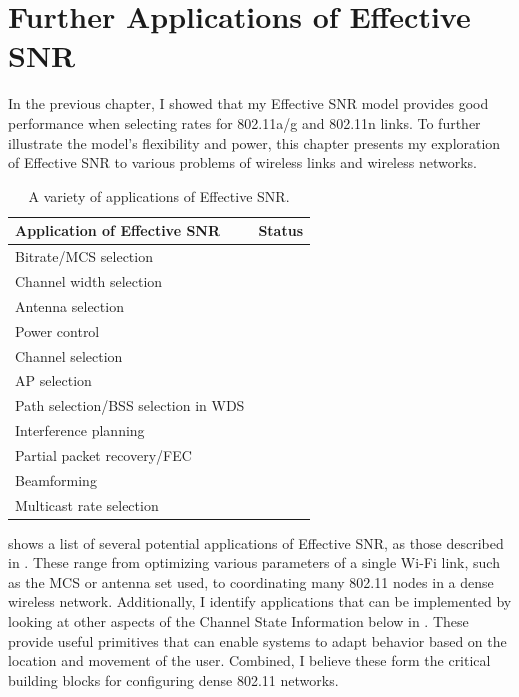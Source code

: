 \ifx\mainfile\undefined

\setcounter{chapter}{7} %
\fi

\cleardoublepage
\chapter{Further Applications of Effective SNR}
\label{chap:applications}

In the previous chapter, I showed that my Effective SNR model provides good performance when selecting rates for 802.11a/g and 802.11n links. To further illustrate the model's flexibility and power, this chapter presents my exploration of Effective SNR to various problems of wireless links and wireless networks.

\begin{table}[htp]
	\centering
	\begin{tabular}{lc}
	\toprule
		\textbf{Application of Effective SNR} & \textbf{Status} \\
	\midrule
		Bitrate/MCS selection & \cite{Halperin_ESNR}\\
		Channel width selection & \cite{Halperin_ESNR}\\
		Antenna selection & \cite{Halperin_ESNR}\\
		Power control & \cite{Halperin_ESNR}\\
		Channel selection & \secref{sec:esnr_chansel}\\
		AP selection & \secref{sec:esnr_apsel}\\
		Path selection/BSS selection in WDS & \secref{sec:esnr_pathsel}\\
		Interference planning \\
		Partial packet recovery/FEC & \cite{Bhartia_FreqDiv}\\
		Beamforming \\
		Multicast rate selection \\
	\bottomrule
	\end{tabular}
	\caption[A variety of applications of Effective SNR]{\label{tab:esnr_uses}A variety of applications of Effective SNR\@.}
\end{table}

 shows a list of several potential applications of Effective SNR, as those described in . These range from optimizing various parameters of a single Wi-Fi link, such as the MCS or antenna set used, to coordinating many 802.11 nodes in a dense wireless network. Additionally, I identify applications that can be implemented by looking at other aspects of the Channel State Information below in . These provide useful primitives that can enable systems to adapt behavior based on the location and movement of the user. Combined, I believe these form the critical building blocks for configuring dense 802.11 networks.

